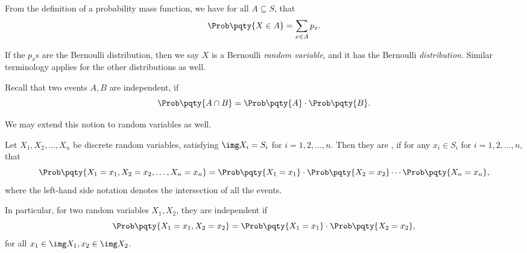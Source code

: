 From the definition of a probability mass function, we have for all \(A \subseteq S\), that
\[
    \Prob\pqty{X \in A} = \sum_{x \in A} p_x.
\]

If the \(p_x\)s are the Bernoulli distribution, then we say \(X\) is a Bernoulli \emph{random variable}, and it has the Bernoulli \emph{distribution}. Similar terminology applies for the other distributions as well.

Recall that two events \(A, B\) are independent, if
\[
    \Prob \pqty{A \cap B} = \Prob\pqty{A} \cdot \Prob\pqty{B}.
\]

We may extend this notion to random variables as well.

\begin{definition}
    \label{def:independence-random-variable}%
    Let \(X_1, X_2, \ldots, X_n\) be discrete random variables, satisfying \(\img X_i = S_i\) for \(i = 1, 2, \ldots, n\). Then they are , if for any \(x_i \in S_i\) for \(i = 1, 2, \ldots, n\), that
    \[
        \Prob\pqty{X_1 = x_1, X_2 = x_2, \ldots, X_n = x_n} = \Prob\pqty{X_1 = x_1} \cdot \Prob\pqty{X_2 = x_2} \cdots \Prob\pqty{X_n = x_n},
    \]
    where the left-hand side notation denotes the intersection of all the events.
\end{definition}

In particular, for two random variables \(X_1, X_2\), they are independent if
\[
    \Prob\pqty{X_1 = x_1, X_2 = x_2} = \Prob\pqty{X_1 = x_1} \cdot \Prob\pqty{X_2 = x_2},
\]
for all \(x_1 \in \img X_1, x_2 \in \img X_2\).

